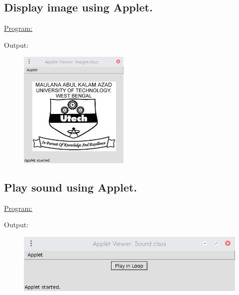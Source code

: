 \documentclass[a4paper,11pt]{article}
\begin{document}
\bigskip

\subsection{Display image using Applet.}
\underline{Program:}


Output:
\begin{figure}[H]
\centering
\includegraphics[width=150pt,height=\textheight,keepaspectratio]{../assign2/pics/7.png}
\end{figure}

\bigskip

\subsection{Play sound using Applet.}
\underline{Program:}


Output:
\begin{figure}[H]
\centering
\includegraphics[width=350pt,height=\textheight,keepaspectratio]{../assign2/pics/9.png}
\end{figure}

\bigskip
\end{document}
